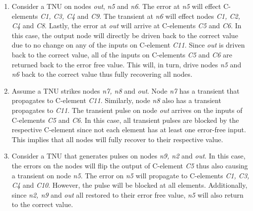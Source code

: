 \begin{enumerate}
	\item Consider a TNU on nodes \textit{out}, \textit{n5} and \textit{n6}. The error at \textit{n5} will effect C-elements \textit{C1, C3, C4} and \textit{C9}. The transient at \textit{n6} will effect nodes \textit{C1, C2, C4} and \textit{C8}. Lastly, the error at \textit{out} will arrive at C-elements \textit{C5} and \textit{C6}. In this case, the output node will directly be driven back to the correct value due to no change on any of the inputs on C-element \textit{C11}. Since \textit{out} is driven back to the correct value, all of the inputs on C-elements \textit{C5} and \textit{C6} are returned back to the error free value. This will, in turn, drive nodes \textit{n5} and \textit{n6} back to the correct value thus fully recovering all nodes.
	
	\item Assume a TNU strikes nodes \textit{n7, n8} and \textit{out}. Node \textit{n7} has a transient that propagates to C-element \textit{C11}. Similarly, node \textit{n8} also has a transient propagates to \textit{C11}. The transient pulse on node \textit{out} arrives on the inputs of C-elements \textit{C5} and \textit{C6}. In this case, all transient pulses are blocked by the respective C-element since not each element has at least one error-free input. This implies that all nodes will fully recover to their respective value.
	
	\item Consider a TNU that generates pulses on nodes \textit{n9, n2} and \textit{out}. In this case, the errors on the nodes will flip the output of C-element \textit{C5} thus also causing a transient on node \textit{n5}. The error on \textit{n5} will propagate to C-elements \textit{C1, C3, C4} and \textit{C10}. However, the pulse will be blocked at all elements. Additionally, since \textit{n2, n9} and \textit{out} all restored to their error free value, \textit{n5} will also return to the correct value.
\end{enumerate}

